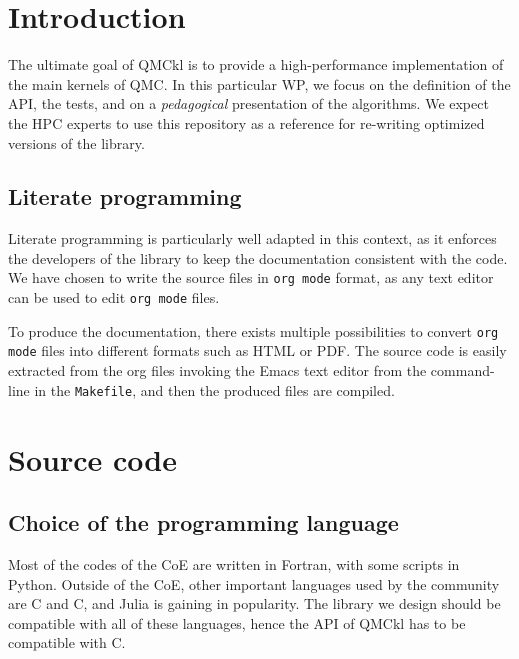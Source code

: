 \newcommand{\orgmode}{\texttt{org mode}}
\newcommand{\Makefile}{\texttt{Makefile}}
\newcommand{\context}{\texttt{context}}
\newcommand{\CC}{C\nolinebreak\hspace{-.05em}\raisebox{.4ex}{\tiny\bf +}\nolinebreak\hspace{-.10em}\raisebox{.4ex}{\tiny\bf +}}
\def\CC{{C\nolinebreak[4]\hspace{-.05em}\raisebox{.4ex}{\tiny\bf ++}}}

\section{Introduction}


The ultimate goal of \ac{QMCkl} is to provide a high-performance
implementation of the main kernels of \ac{QMC}. In this particular
\ac{WP}, we focus on the definition of the \ac{API}, the tests,
and on a \emph{pedagogical} presentation of the algorithms.  We expect
the \ac{HPC} experts to use this repository as a reference for re-writing
optimized versions of the library.

\subsection{Literate programming}

Literate programming\cite{knuth_1992} is particularly well adapted in this
context, as it enforces the developers of the library to keep the
documentation consistent with the code.  We have chosen to write the
source files in {\orgmode} format,\cite{schulte_2012}
as any text editor can be used to edit {\orgmode} files.

To
produce the documentation, there exists multiple possibilities to
convert {\orgmode} files into different formats such as
\ac{HTML} or \ac{PDF}. The source code is easily extracted from the org
files invoking the Emacs text editor from the command-line in the
{\Makefile}, and then the produced files are compiled.

\section{Source code}

\subsection{Choice of the programming language}

Most of the codes of the \ac{CoE} are written in Fortran, with some
scripts in Python. Outside of the \ac{CoE}, other important languages
used by the community are C and {\CC}, and Julia is gaining in
popularity. The library we design should be compatible with all of
these languages, hence the \ac{API} of \ac{QMCkl} has to be compatible
with C.

